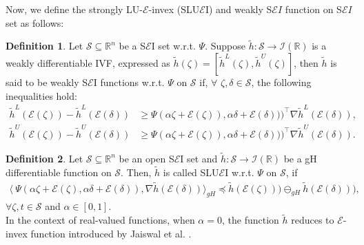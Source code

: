 \documentclass[12pt, reqno]{amsart}
\theoremstyle{definition}
\newtheorem{definition}{Definition}[section]
\theoremstyle{remark}
\numberwithin{equation}{section}
\begin{document}
      Now, we define the strongly LU-$\mathcal{E}$-invex (SLU$\mathcal{E}$I) and weakly S$\mathcal{E}I$ function on S$\mathcal{E}I$ set as follows:  
\begin{definition}  \label{definition 3.6 p4}
    Let $\mathcal{S} \subseteq \mathbb{R}^n$ be a S$\mathcal{\mathcal{E}}$I set w.r.t. $ {\Psi}$. Suppose $\tilde{h} : \mathcal{S} \rightarrow \mathcal{I}(\mathbb{R})$ is a weakly differentiable IVF, expressed as $\tilde{h}(\mathit{\zeta} ) = [\tilde{h}^L(\mathit{\zeta} ), \tilde{h}^U(\mathit{\zeta} )]$, then $\tilde{h}$ is said to be weakly S$\mathcal{\mathcal{E}}$I functions w.r.t. $ {\Psi}$ on $ \mathcal{S}$ if, $\forall$ $\mathit{\zeta} ,\mathit{\delta}  \in \mathcal{S}$, the following inequalities hold:
\begin{equation} 
    \begin{aligned}
        \tilde{h}^L(\mathcal{\mathcal{E}}(\mathit{\zeta} )) - \tilde{h}^L(\mathcal{\mathcal{E}}(\mathit{\delta} )) 
        &\geq \Psi({\alpha} \mathit{\zeta} + \mathcal{\mathcal{E}}(\mathit{\zeta} )), {\alpha}\mathit{\delta} + \mathcal{\mathcal{E}}(\mathit{\delta} )))^{\!\top}\nabla \tilde{h}^L(\mathcal{\mathcal{E}}(\mathit{\delta} )),
    \end{aligned}
\end{equation}
\begin{equation}
    \begin{aligned}
        \tilde{h}^U(\mathcal{\mathcal{E}}(\mathit{\zeta} )) - \tilde{h}^U(\mathcal{\mathcal{E}}(\mathit{\delta} )) 
        &\geq \Psi({\alpha} \mathit{\zeta} + \mathcal{\mathcal{E}}(\mathit{\zeta} )), {\alpha}\mathit{\delta} + \mathcal{\mathcal{E}}(\mathit{\delta} )))^{\!\top}\nabla \tilde{h}^U(\mathcal{\mathcal{E}}(\mathit{\delta} )).
    \end{aligned}
\end{equation}

\end{definition}

\begin{definition} \label{definition 3.7 p4}
Let $\mathcal{S}\subseteq  \mathbb{R}^{n}$ be an open S$\mathcal{\mathcal{E}}$I set and  $\tilde{h}\colon \mathcal{S}\rightarrow \mathcal{I}(\mathbb{R})$ be a gH differentiable function on $\mathcal{S}$. Then, $\tilde{h}$ is  called  SLU$\mathcal{\mathcal{E}}$I w.r.t. $ {\Psi}$ on $ \mathcal{S}$, if
\begin{eqnarray*}
		\langle\ {\Psi}( {\alpha} \mathit{\zeta} + \mathcal{\mathcal{E}}(\mathit{\zeta} ), {\alpha}\mathit{\delta} + \mathcal{\mathcal{E}}(\mathit{\delta} )),\nabla  \tilde{h}( \mathcal{\mathcal{E}}(\mathit{\delta} ))\rangle_{gH}\preceq  \tilde{h}( \mathcal{\mathcal{E}}(\mathit{\zeta} )))\ominus_{gH} \tilde{h}( \mathcal{\mathcal{E}}(\mathit{\delta} ))),
\end{eqnarray*}
  $\forall \mathit{\zeta} ,\mathit  t\in \mathcal {S}$ and $ {\alpha}\in {[0,1]} $.\\
 In the context of real-valued functions, when $\alpha = 0$, the function $\tilde{h}$ reduces to  $\mathcal{E}$-invex function introduced by Jaiswal et al. \cite{Jaiswal}. 
\end{definition} 
\end{document}
